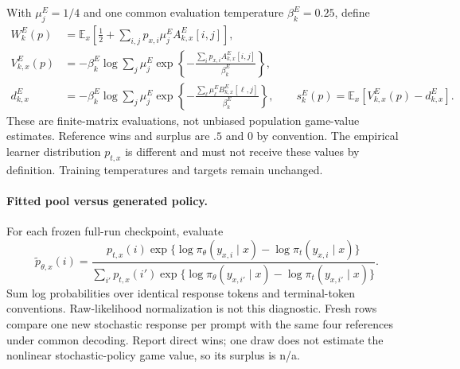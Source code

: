 \documentclass{article}
\theoremstyle{remark}
\theoremstyle{plain}
\newcommand{\E}{\mathbb{E}}
\begin{document}
With $\mu_j^E=1/4$ and one common evaluation temperature $\beta_k^E=0.25$, define
\begin{align}
 W_k^E(p)&=\E_x\left[\tfrac12+\sum_{i,j}p_{x,i}\mu_j^E A^E_{k,x}[i,j]\right],\label{eq:transfer-wins}\\
 V^E_{k,x}(p)&=-\beta_k^E\log\sum_j\mu_j^E
 \exp\!\left\{-\frac{\sum_i p_{x,i}A^E_{k,x}[i,j]}{\beta_k^E}\right\},\label{eq:transfer-value}\\
 d^E_{k,x}&=-\beta_k^E\log\sum_j\mu_j^E
 \exp\!\left\{-\frac{\sum_\ell\mu_\ell^E B^E_{k,x}[\ell,j]}{\beta_k^E}\right\},\qquad
 s_k^E(p)=\E_x[V^E_{k,x}(p)-d^E_{k,x}].\label{eq:transfer-surplus}
\end{align}
These are finite-matrix evaluations, not unbiased population game-value estimates. Reference wins and surplus are $.5$ and $0$ by convention. The empirical learner distribution $p_{t,x}$ is different and must not receive these values by definition. Training temperatures and targets remain unchanged.

\paragraph{Fitted pool versus generated policy.}
For each frozen full-run checkpoint, evaluate
\[
 \widetilde p_{\theta,x}(i)
 =\frac{p_{t,x}(i)\exp\{\log\pi_\theta(y_{x,i}\mid x)-\log\pi_t(y_{x,i}\mid x)\}}
 {\sum_{i'}p_{t,x}(i')\exp\{\log\pi_\theta(y_{x,i'}\mid x)-\log\pi_t(y_{x,i'}\mid x)\}}.
\]
Sum log probabilities over identical response tokens and terminal-token conventions. Raw-likelihood normalization is not this diagnostic. Fresh rows compare one new stochastic response per prompt with the same four references under common decoding. Report direct wins; one draw does not estimate the nonlinear stochastic-policy game value, so its surplus is n/a.
\end{document}
